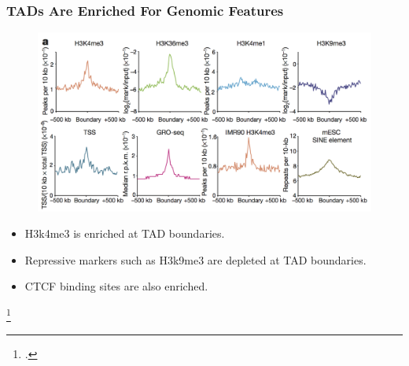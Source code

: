 \documentclass[12pt]{beamer}
\begin{document}
\begin{frame}
\frametitle{TADs Are Enriched For Genomic Features}

\begin{figure}
\includegraphics[scale=0.85]{feature.png}
\end{figure}

\begin{itemize}
\item H3k4me3 is enriched at TAD boundaries.
\vspace{0.1cm}
\item Repressive markers such as H3k9me3 are depleted at TAD boundaries.
\vspace{0.1cm}
\item CTCF binding sites are also enriched. 
\end{itemize}

\footcitetext{dixon2012}

\end{frame}
\end{document}
